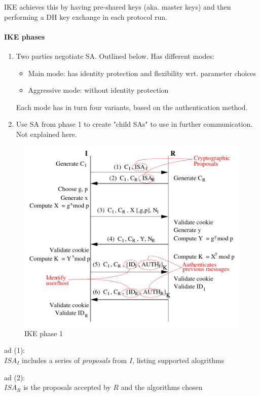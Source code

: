 IKE achieves this by having pre-shared keys (aka. master keys) and then performing a DH key exchange in each protocol run.

\paragraph{IKE phases}
\begin{enumerate}[1)]
    \item Two parties negotiate SA. Outlined below. Has different modes:
    \begin{itemize}
        \item Main mode: has identity protection and flexibility wrt. parameter choices
        \item Aggressive mode: without identity protection
    \end{itemize}
    Each mode has in turn four variants, based on the authentication method.
    \item Use SA from phase 1 to create "child SAs" to use in further communication. Not explained here.
\end{enumerate}

\begin{figure}[h]
    \centering
    \includegraphics[width=12cm]{images/ch9-ike-phase1.png}
    \caption{IKE phase 1}
    \label{fig:ike-phase1}
\end{figure}

ad (1):\\
$ISA_I$ includes a series of \emph{proposals} from $I$, listing supported alogrithms

ad (2):\\
$ISA_R$ is the proposals accepted by $R$ and the algorithms chosen

